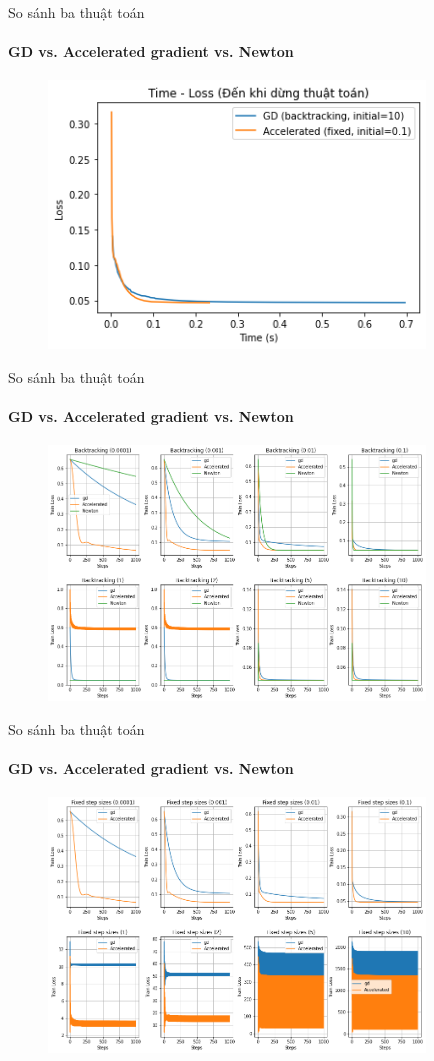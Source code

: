 \documentclass[10pt]{beamer}
\theoremstyle{remark}
\theoremstyle{definition}
\begin{document}
\begin{frame}{So sánh ba thuật toán}
	\framesubtitle{GD vs. Accelerated gradient vs. Newton}
	\begin{figure}[h!]
		\centering
		\includegraphics[width=10cm]{Thinh/24.png}
	\end{figure}
\end{frame}


\begin{frame}{So sánh ba thuật toán}
	\framesubtitle{GD vs. Accelerated gradient vs. Newton}
	\begin{figure}[h!]
		\centering
		\includegraphics[width=10cm]{Thinh/25.png}
	\end{figure}
\end{frame}

\begin{frame}{So sánh ba thuật toán}
	\framesubtitle{GD vs. Accelerated gradient vs. Newton}
	\begin{figure}[h!]
		\centering
		\includegraphics[width=10cm]{Thinh/26.png}
	\end{figure}
\end{frame}
\end{document}
